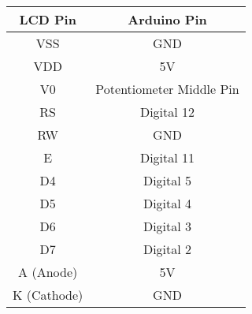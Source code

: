 \begin{tabular}{|c|c|}
    \hline
    \textbf{LCD Pin} & \textbf{Arduino Pin} \\
    \hline
    VSS & GND \\
    \hline
    VDD & 5V \\
    \hline
    V0 & Potentiometer Middle Pin \\
    \hline
    RS & Digital 12 \\
    \hline
    RW & GND \\
    \hline
    E & Digital 11 \\
    \hline
    D4 & Digital 5 \\
    \hline
    D5 & Digital 4 \\
    \hline
    D6 & Digital 3 \\
    \hline
    D7 & Digital 2 \\
    \hline
    A (Anode) & 5V \\
    \hline
    K (Cathode) & GND \\
    \hline
\end{tabular}